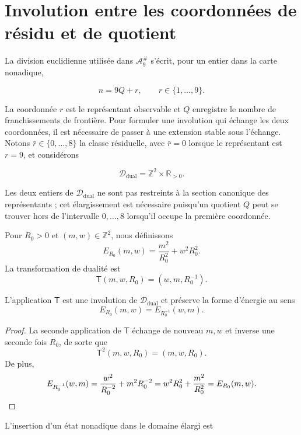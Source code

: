 \section{Involution entre les coordonnées de résidu et de quotient}
\label{sec:dualidad-visible-memoria}

La division euclidienne utilisée dans \(\mathcal A_9^\#\) s'écrit, pour un entier dans
la carte nonadique,

\[
n=9Q+r,
\qquad r\in\{1,\ldots,9\}.
\]

La coordonnée \(r\) est le représentant observable et \(Q\) enregistre le
nombre de franchissements de frontière. Pour formuler une involution qui échange
les deux coordonnées, il est nécessaire de passer à une extension stable sous
l'échange. Notons \(\bar r\in\{0,\ldots,8\}\) la classe résiduelle,
avec \(\bar r=0\) lorsque le représentant est \(r=9\), et considérons

\[
\mathscr D_{\mathrm{dual}}=\mathbb Z^2\times\mathbb R_{>0}.
\]

Les deux entiers de \(\mathscr D_{\mathrm{dual}}\) ne sont pas restreints à la section canonique des
représentants ; cet élargissement est nécessaire puisqu'un quotient \(Q\) peut
se trouver hors de l'intervalle \(0,\ldots,8\) lorsqu'il occupe la première coordonnée.

\begin{definition}
Pour \(R_0>0\) et \((m,w)\in\mathbb Z^2\), nous définissons
\[
E_{R_0}(m,w)=\frac{m^2}{R_0^2}+w^2R_0^2.
\]
La transformation de dualité est
\[
\mathsf T(m,w,R_0)=(w,m,R_0^{-1}).
\]
\end{definition}

\begin{theorem}
\label{thm:dualidad-visible-memoria}
L'application \(\mathsf T\) est une involution de \(\mathscr D_{\mathrm{dual}}\) et préserve
la forme d'énergie au sens
\[
E_{R_0}(m,w)=E_{R_0^{-1}}(w,m).
\]
\end{theorem}

\begin{proof}
La seconde application de \(\mathsf T\) échange de nouveau \(m,w\) et
inverse une seconde fois \(R_0\), de sorte que
\[
\mathsf T^2(m,w,R_0)=(m,w,R_0).
\]
De plus,
\[
E_{R_0^{-1}}(w,m)
=\frac{w^2}{R_0^{-2}}+m^2R_0^{-2}
=w^2R_0^2+\frac{m^2}{R_0^2}
=E_{R_0}(m,w).\qedhere
\]
\end{proof}

L'insertion d'un état nonadique dans le domaine élargi est

